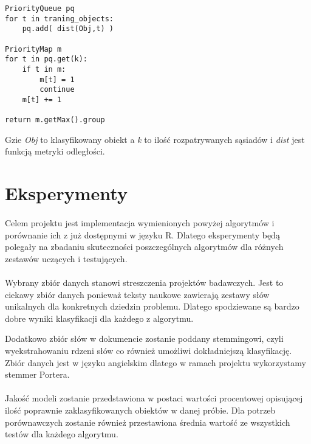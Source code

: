 \documentclass[a4paper,12pt]{article}
\begin{document}
\begin{verbatim}
PriorityQueue pq
for t in traning_objects:
    pq.add( dist(Obj,t) )

PriorityMap m
for t in pq.get(k):
    if t in m:
        m[t] = 1
        continue
    m[t] += 1 

return m.getMax().group
\end{verbatim}

Gzie \textit{Obj} to klasyfikowany obiekt a \textit{k} to ilość
rozpatrywanych sąsiadów i \textit{dist} jest funkcją metryki odległości.

\section{Eksperymenty}
\paragraph{}
Celem projektu jest implementacja wymienionych powyżej algorytmów i porównanie ich z już dostępnymi w języku R. Dlatego eksperymenty będą polegały na zbadaniu skuteczności poszczególnych algorytmów dla różnych zestawów uczących i testujących. 


\paragraph{}
Wybrany zbiór danych stanowi streszczenia projektów badawczych. Jest to
ciekawy zbiór danych ponieważ teksty naukowe zawierają zestawy słów
unikalnych dla konkretnych dziedzin problemu. Dlatego spodziewane są bardzo
dobre wyniki klasyfikacji dla każdego z algorytmu. 

Dodatkowo zbiór słów w dokumencie zostanie poddany stemmingowi, czyli
wyekstrahowaniu rdzeni słów co również umożliwi dokładniejszą klasyfikację.
Zbiór danych jest w języku angielskim dlatego w ramach projektu wykorzystamy
stemmer Portera.  


\paragraph{}
Jakość modeli zostanie przedstawiona w postaci wartości procentowej
opisującej ilość poprawnie zaklasyfikowanych obiektów w danej próbie. Dla
potrzeb porównawczych zostanie również przestawiona średnia wartość ze
wszystkich testów dla każdego algorytmu. 
\end{document}
